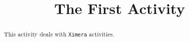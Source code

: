 \documentclass{ximera}
\title{The First Activity}
\begin{document}
      
\begin{abstract}
      
This activity deals with \verb!Ximera! activities.
      
\end{abstract}
      
\maketitle
      
\end{document}
